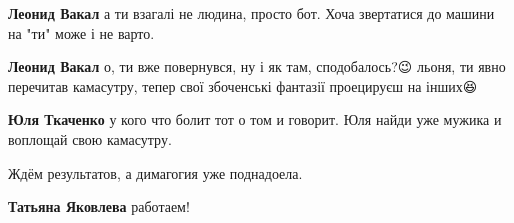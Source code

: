 \begin{itemize}
\begin{itemize}
 
\textbf{Леонид Вакал} а ти взагалі не людина, просто бот. Хоча звертатися до машини на "ти" може і не варто.

 
\textbf{Леонид Вакал} о, ти вже повернувся, ну і як там, сподобалось?😉 льоня,
ти явно перечитав камасутру, тепер свої збоченські фантазії проецируєш на
інших😆

 
\textbf{Юля Ткаченко} у кого что болит тот о том и говорит. Юля найди уже мужика и воплощай свою камасутру.
\end{itemize}

 
Ждём результатов, а димагогия уже поднадоела.

\begin{itemize}
 
\textbf{Татьяна Яковлева} работаем!
\end{itemize}

 

\end{itemize}
